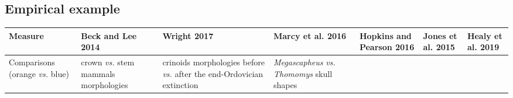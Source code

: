 \documentclass[]{article}
\begin{document}
\subsection{Empirical example}\label{empirical-example}

\renewcommand\baselinestretch{1}\selectfont

\begin{longtable}[]{@{}lllllll@{}}
\toprule
\begin{minipage}[b]{0.09\columnwidth}\raggedright\strut
Measure\strut
\end{minipage} & \begin{minipage}[b]{0.11\columnwidth}\raggedright\strut
Beck and Lee 2014\strut
\end{minipage} & \begin{minipage}[b]{0.12\columnwidth}\raggedright\strut
Wright 2017\strut
\end{minipage} & \begin{minipage}[b]{0.13\columnwidth}\raggedright\strut
Marcy et al. 2016\strut
\end{minipage} & \begin{minipage}[b]{0.11\columnwidth}\raggedright\strut
Hopkins and Pearson 2016\strut
\end{minipage} & \begin{minipage}[b]{0.13\columnwidth}\raggedright\strut
Jones et al. 2015\strut
\end{minipage} & \begin{minipage}[b]{0.11\columnwidth}\raggedright\strut
Healy et al. 2019\strut
\end{minipage}\tabularnewline
\midrule
\endhead
\begin{minipage}[t]{0.09\columnwidth}\raggedright\strut
Comparisons (orange \emph{vs.} blue)\strut
\end{minipage} & \begin{minipage}[t]{0.11\columnwidth}\raggedright\strut
crown \emph{vs.} stem mammals morphologies\strut
\end{minipage} & \begin{minipage}[t]{0.12\columnwidth}\raggedright\strut
crinoids morphologies before \emph{vs.} after the end-Ordovician
extinction\strut
\end{minipage} & \begin{minipage}[t]{0.13\columnwidth}\raggedright\strut
\emph{Megascapheus} \emph{vs.} \emph{Thomomys} skull shapes\strut
\end{minipage} & \begin{minipage}[t]{0.11\columnwidth}\raggedright\strut

\end{minipage}
\end{longtable}
\end{document}
